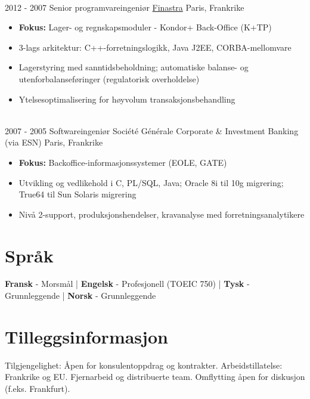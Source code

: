 \documentclass[letterpaper]{twentysecondcv} %
\begin{document}
\begin{twentytimeline}
{\begin{itemize}
		\end{itemize}}
	\\
	\twentyitemtimeline{\faCode}
		{2012 -}
		{2007}
		{Senior programvareingeniør}
		{\href{https://finastra.com}{Finastra}}
		{Paris, Frankrike}
		{\begin{itemize}
		\item \textbf{Fokus:} Lager- og regnskapsmoduler - Kondor+ Back-Office (K+TP)
		\item 3-lags arkitektur: C++-forretningslogikk, Java J2EE, CORBA-mellomvare
		\item Lagerstyring med sanntidsbeholdning; automatiske balanse- og utenforbalanseføringer (regulatorisk overholdelse)
		\item Ytelsesoptimalisering for høyvolum transaksjonsbehandling
		\end{itemize}}
	\\
	\twentyitemtimeline{\faBriefcase}
		{2007 -}
		{2005}
		{Softwareingeniør}
		{Société Générale Corporate \& Investment Banking (via ESN)}
		{Paris, Frankrike}
		{\begin{itemize}
		\item \textbf{Fokus:} Backoffice-informasjonssystemer (EOLE, GATE)
		\item Utvikling og vedlikehold i C, PL/SQL, Java; Oracle 8i til 10g migrering; True64 til Sun Solaris migrering
		\item Nivå 2-support, produksjonshendelser, kravanalyse med forretningsanalytikere
		\end{itemize}}
\end{twentytimeline}


\section{Språk}

\textbf{Fransk} - Morsmål | \textbf{Engelsk} - Profesjonell (TOEIC 750) | \textbf{Tysk} - Grunnleggende | \textbf{Norsk} - Grunnleggende

\section{Tilleggsinformasjon}

Tilgjengelighet: Åpen for konsulentoppdrag og kontrakter. Arbeidstillatelse: Frankrike og EU. Fjernarbeid og distribuerte team. Omflytting åpen for diskusjon (f.eks. Frankfurt).

\end{document}

